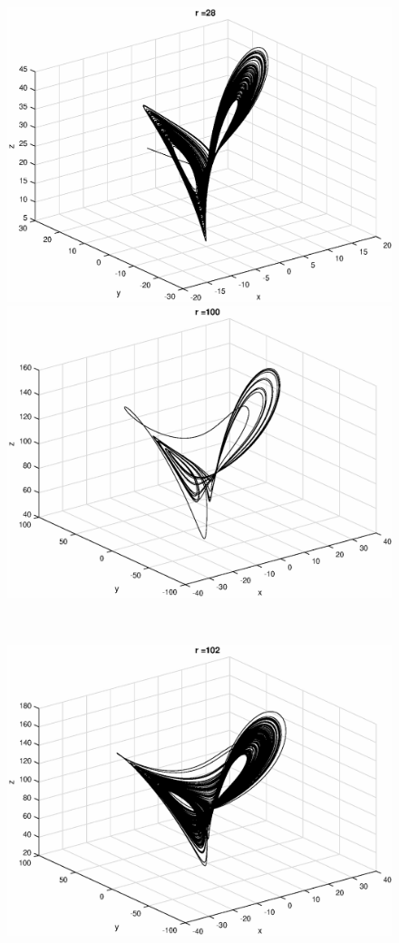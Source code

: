 \begin{figure}[!htb]
\begin{minipage}{0.4\textwidth}
\includegraphics[width = \textwidth]{r=28.eps}
\end{minipage}
\begin{minipage}{0.4\textwidth}
\includegraphics[width = \textwidth]{r=100.eps}
\end{minipage} \\
\begin{minipage}{0.4\textwidth}
\includegraphics[width = \textwidth]{r=102.eps}

\end{minipage}
\end{figure}
